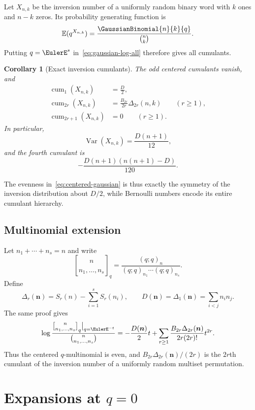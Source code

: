\documentclass[11pt,oneside]{article}
\newtheorem{corollary}[theorem]{Corollary}
\theoremstyle{definition}
\theoremstyle{remark}
\newcommand{\qmultinom}[2]{\genfrac{[}{]}{0pt}{}{#1}{#2}_{q}}
\let\reporttopsection\section
\let\reportsubsection\subsection
\let\chapter\reporttopsection
\let\section\reportsubsection
\begin{document}
Let $X_{n,k}$ be the inversion number of a uniformly random binary word with
$k$ ones and $n-k$ zeros.  Its probability generating function is
\[
 \mathbb E(q^{X_{n,k}})=\frac{\GaussianBinomial{n}{k}{q}}{\binom nk}.
\]
Putting $q=\EulerE^s$ in~\eqref{eq:gaussian-log-all} therefore gives all cumulants.

\begin{corollary}[Exact inversion cumulants]\label{cor:inversion-cumulants}
The odd centered cumulants vanish, and
\begin{align*}
 \operatorname{cum}_1(X_{n,k})&=\frac D2,\\
 \operatorname{cum}_{2r}(X_{n,k})
 &=\frac{B_{2r}}{2r}\Delta_{2r}(n,k)\qquad(r\ge1),\\
 \operatorname{cum}_{2r+1}(X_{n,k})&=0\qquad(r\ge1).
\end{align*}
In particular,
\[
 \operatorname{Var}(X_{n,k})=\frac{D(n+1)}{12},
\]
and the fourth cumulant is
\[
 -\frac{D(n+1)(n(n+1)-D)}{120}.
\]
\end{corollary}

The evenness in~\eqref{eq:centered-gaussian} is thus exactly the symmetry of
the inversion distribution about $D/2$, while Bernoulli numbers encode its
entire cumulant hierarchy.

\section{Multinomial extension}

Let $n_1+\cdots+n_s=n$ and write
\[
 \qmultinom{n}{n_1,\ldots,n_s}
 =\frac{(q;q)_n}{(q;q)_{n_1}\cdots(q;q)_{n_s}}.
\]
Define
\[
 \Delta_r(\bm n)=S_r(n)-\sum_{i=1}^{s}S_r(n_i),
 \qquad
 D(\bm n)=\Delta_1(\bm n)=\sum_{i<j}n_i n_j.
\]
The same proof gives
\begin{equation}\label{eq:qmult-qone}
 \log\frac{\qmultinom{n}{n_1,\ldots,n_s}\big|_{q=\EulerE^{-t}}}
 {\binom{n}{n_1,\ldots,n_s}}
 =-\frac{D(\bm n)}2t+
 \sum_{r\ge1}\frac{B_{2r}\Delta_{2r}(\bm n)}{2r(2r)!}t^{2r}.
\end{equation}
Thus the centered $q$-multinomial is even, and
$B_{2r}\Delta_{2r}(\bm n)/(2r)$ is the $2r$th cumulant of the inversion
number of a uniformly random multiset permutation.

\chapter{Expansions at \texorpdfstring{$q=0$}{q = 0}}\label{chap:qzero}
\end{document}
